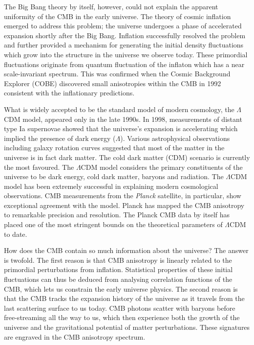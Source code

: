 The Big Bang theory by itself, however, could not explain the apparent uniformity of the CMB in the early universe. The theory of cosmic inflation emerged to address this problem; the universe undergoes a phase of accelerated expansion shortly after the Big Bang. Inflation successfully resolved the problem and further provided a mechanism for generating the initial density fluctuations which grow into the structure in the universe we observe today. These primordial fluctuations originate from quantum fluctuation of the inflaton which has a near scale-invariant spectrum. This was confirmed when the Cosmic Background Explorer (COBE) discovered small anisotropies within the CMB in 1992 consistent with the inflationary predictions.

What is widely accepted to be the standard model of modern cosmology, the $\Lambda$CDM model, appeared only in the late 1990s. In 1998, measurements of distant type Ia supernovae showed that the universe's expansion is accelerating which implied the presence of dark energy ($\Lambda$). Various astrophysical observations including galaxy rotation curves suggested that most of the matter in the universe is in fact dark matter. The cold dark matter (CDM) scenario is currently the most favoured. The $\Lambda$CDM model considers the primary constituents of the universe to be dark energy, cold dark matter, baryons and radiation. The $\Lambda$CDM model has been extremely successful in explaining modern cosmological observations. CMB measurements from the \textit{Planck} satellite, in particular, show exceptional agreement with the model. Planck has mapped the CMB anisotropy to remarkable precision and resolution. The Planck CMB data by itself has placed one of the most stringent bounds on the theoretical parameters of $\Lambda$CDM to date.

How does the CMB contain so much information about the universe? The answer is twofold. The first reason is that CMB anisotropy is linearly related to the primordial perturbations from inflation. Statistical properties of these initial fluctuations can thus be deduced from analysing correlation functions of the CMB, which lets us constrain the early universe physics. The second reason is that the CMB tracks the expansion history of the universe as it travels from the last scattering surface to us today. CMB photons scatter with baryons before free-streaming all the way to us, which then experience both the growth of the universe and the gravitational potential of matter perturbations. These signatures are engraved in the CMB anisotropy spectrum.

